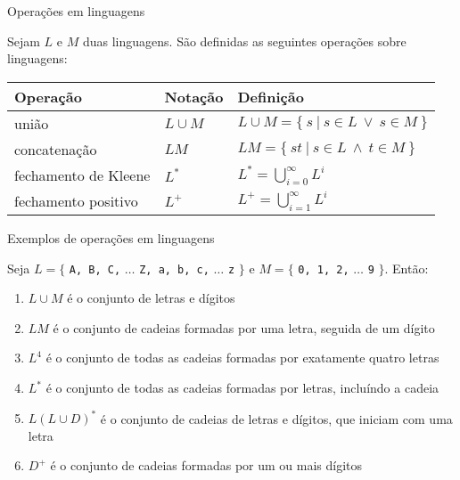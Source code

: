 \begin{frame}[fragile]{Operações em linguagens}

    Sejam $L$ e $M$ duas linguagens. São definidas as seguintes operações sobre linguagens:
    \pause
    \vspace{0.2in}

    \begin{tabularx}{0.95\textwidth}{llX}
        \toprule
        \textbf{Operação} & \textbf{Notação} & \textbf{Definição} \\
        \midrule
        união & $L\cup M$ & $L\cup M = \{\ s\ |\ s\in L\ \vee\ s\in M\ \}$ \\
        \rowcolor[gray]{0.9}
        concatenação & $LM$ & $LM = \{\ st\ |\ s\in L\ \land\ t\in M\ \}$ \\
        fechamento de Kleene & $\displaystyle L^*$ & $\displaystyle L^* = \bigcup_{i = 0}^\infty L^i$ \\
        \rowcolor[gray]{0.9}
        fechamento positivo & $L^+$ & $\displaystyle L^+ = \bigcup_{i = 1}^\infty L^i$ \\
        \bottomrule
    \end{tabularx}

\end{frame}

\begin{frame}[fragile]{Exemplos de operações em linguagens}

    Seja $L = \{$ \texttt{A, B, C,} $\ldots$ \texttt{Z, a, b, c,} $\ldots$ \texttt{z} $\}$ e $M = \{$ \texttt{0, 1, 2,} $\ldots$ \texttt{9} $\}$. Então:
    \vspace{0.2in}
    \pause

    \begin{enumerate}
        \item $L\cup M$ é o conjunto de letras e dígitos
        \pause

        \item $LM$ é o conjunto de cadeias formadas por uma letra, seguida de um dígito
        \pause

        \item $L^4$ é o conjunto de todas as cadeias formadas por exatamente quatro letras
        \pause

        \item $L^*$ é o conjunto de todas as cadeias formadas por letras, incluíndo a cadeia 
        \pause

        \item $L(L\cup D)^*$ é o conjunto de cadeias de letras e dígitos, que iniciam com uma letra
        \pause

        \item $D^+$ é o conjunto de cadeias formadas por um ou mais dígitos
    \end{enumerate}

\end{frame}


